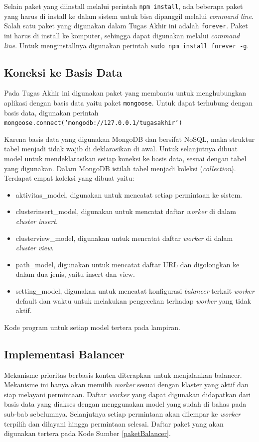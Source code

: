 \documentclass{ta-its}
\begin{document}
				Selain paket yang diinstall melalui perintah \texttt{npm install}, ada beberapa paket yang harus di install ke dalam sistem untuk bisa dipanggil melalui \textit{command line}. Salah satu paket yang digunakan dalam Tugas Akhir ini adalah \texttt{forever}. Paket ini harus di install ke komputer, sehingga dapat digunakan melalui \textit{command line}. Untuk menginstallnya digunakan perintah \texttt{sudo npm install forever -g}.
        
	        \subsection{Koneksi ke Basis Data}
		        Pada Tugas Akhir ini digunakan paket yang membantu untuk menghubungkan aplikasi dengan basis data yaitu paket \texttt{mongoose}. Untuk dapat terhubung dengan basis data, digunakan perintah \texttt{mongoose.connect('mongodb://127.0.0.1/tugasakhir')}
		        
		        Karena basis data yang digunakan MongoDB dan bersifat NoSQL, maka struktur tabel menjadi tidak wajib di deklarasikan di awal. Untuk selanjutnya dibuat model untuk mendeklarasikan setiap koneksi ke basis data, sesuai dengan tabel yang digunakan. Dalam MongoDB istilah tabel menjadi koleksi (\textit{collection}). Terdapat empat koleksi yang dibuat yaitu:
		        
		        \begin{itemize}
		        	\item aktivitas\_model, digunakan untuk mencatat setiap permintaan ke sistem.
		        	\item clusterinsert\_model, digunakan untuk mencatat daftar \textit{worker} di dalam \textit{cluster insert}.
		        	\item clusterview\_model, digunakan untuk mencatat daftar \textit{worker} di dalam \textit{cluster view}.
		        	\item path\_model, digunakan untuk mencatat daftar URL dan digolongkan ke dalam dua jenis, yaitu insert dan view.
		        	\item setting\_model, digunakan untuk mencatat konfigurasi \textit{balancer} terkait \textit{worker} default dan waktu untuk melakukan pengecekan terhadap \textit{worker} yang tidak aktif.
		        \end{itemize}
		        
		        Kode program untuk setiap model tertera pada lampiran.
			
			\subsection{Implementasi Balancer}
				Mekanisme prioritas berbasis konten diterapkan untuk menjalankan balancer. Mekanisme ini hanya akan memilih \textit{worker} sesuai dengan klaster yang aktif dan siap melayani permintaan. Daftar \textit{worker} yang dapat digunakan didapatkan dari basis data yang diakses dengan menggunakan model yang sudah di bahas pada sub-bab sebelumnya. Selanjutnya setiap permintaan akan dilempar ke \textit{worker} terpilih dan dilayani hingga permintaan selesai. Daftar paket yang akan digunakan tertera pada Kode Sumber \ref{paketBalancer}.
				
\end{document}
